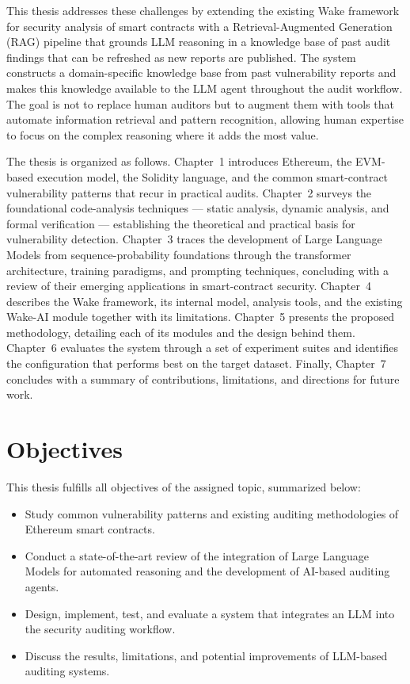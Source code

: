 This thesis addresses these challenges by extending the existing Wake framework for security analysis of smart contracts with a Retrieval-Augmented Generation (RAG) pipeline that grounds LLM reasoning in a knowledge base of past audit findings that can be refreshed as new reports are published. The system constructs a domain-specific knowledge base from past vulnerability reports and makes this knowledge available to the LLM agent throughout the audit workflow. The goal is not to replace human auditors but to augment them with tools that automate information retrieval and pattern recognition, allowing human expertise to focus on the complex reasoning where it adds the most value.

The thesis is organized as follows. Chapter~1 introduces Ethereum, the EVM-based execution model, the Solidity language, and the common smart-contract vulnerability patterns that recur in practical audits. Chapter~2 surveys the foundational code-analysis techniques --- static analysis, dynamic analysis, and formal verification --- establishing the theoretical and practical basis for vulnerability detection. Chapter~3 traces the development of Large Language Models from sequence-probability foundations through the transformer architecture, training paradigms, and prompting techniques, concluding with a review of their emerging applications in smart-contract security. Chapter~4 describes the Wake framework, its internal model, analysis tools, and the existing Wake-AI module together with its limitations. Chapter~5 presents the proposed methodology, detailing each of its modules and the design behind them. Chapter~6 evaluates the system through a set of experiment suites and identifies the configuration that performs best on the target dataset. Finally, Chapter~7 concludes with a summary of contributions, limitations, and directions for future work.


\chapter*{Objectives}
\label{ch:objectives}

This thesis fulfills all objectives of the assigned topic, summarized below:

\begin{itemize}
    \item Study common vulnerability patterns and existing auditing methodologies of Ethereum smart contracts.
    \item Conduct a state-of-the-art review of the integration of Large Language Models for automated reasoning and the development of AI-based auditing agents.
    \item Design, implement, test, and evaluate a system that integrates an LLM into the security auditing workflow.
    \item Discuss the results, limitations, and potential improvements of LLM-based auditing systems.
\end{itemize}

